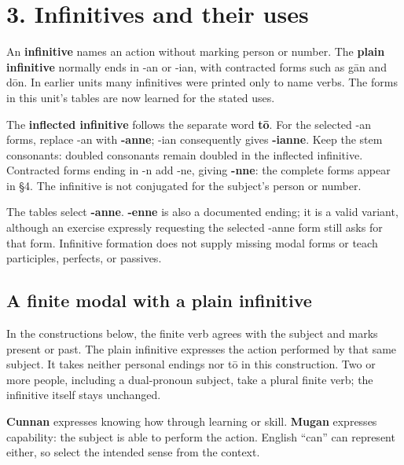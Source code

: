 \section*{3. Infinitives and their uses}

An \textbf{infinitive} names an action without marking person or number. The \textbf{plain infinitive} normally ends in -an or -ian, with contracted forms such as gān and dōn. In earlier units many infinitives were printed only to name verbs. The forms in this unit’s tables are now learned for the stated uses.

The \textbf{inflected infinitive} follows the separate word \textbf{tō}. For the selected -an forms, replace -an with \textbf{-anne}; -ian consequently gives \textbf{-ianne}. Keep the stem consonants: doubled consonants remain doubled in the inflected infinitive. Contracted forms ending in -n add -ne, giving \textbf{-nne}: the complete forms appear in §4. The infinitive is not conjugated for the subject’s person or number.

The tables select \textbf{-anne}. \textbf{-enne} is also a documented ending; it is a valid variant, although an exercise expressly requesting the selected -anne form still asks for that form. Infinitive formation does not supply missing modal forms or teach participles, perfects, or passives.

\subsection*{A finite modal with a plain infinitive}

In the constructions below, the finite verb agrees with the subject and marks present or past. The plain infinitive expresses the action performed by that same subject. It takes neither personal endings nor tō in this construction. Two or more people, including a dual-pronoun subject, take a plural finite verb; the infinitive itself stays unchanged.

\textbf{Cunnan} expresses knowing how through learning or skill. \textbf{Mugan} expresses capability: the subject is able to perform the action. English “can” can represent either, so select the intended sense from the context.

